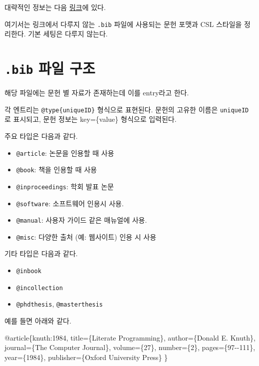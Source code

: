 \documentclass[
  letterpaper,
]{scrbook}
\newenvironment{Shaded}{\begin{snugshade}}{\end{snugshade}}
\newcommand{\DataTypeTok}[1]{\textcolor[rgb]{0.68,0.00,0.00}{#1}}
\newcommand{\NormalTok}[1]{\textcolor[rgb]{0.00,0.23,0.31}{#1}}
\newcommand{\OtherTok}[1]{\textcolor[rgb]{0.00,0.23,0.31}{#1}}
\newcommand{\VariableTok}[1]{\textcolor[rgb]{0.07,0.07,0.07}{#1}}
\providecommand{\tightlist}{%
  \setlength{\itemsep}{0pt}\setlength{\parskip}{0pt}}\usepackage{longtable,booktabs,array}
\begin{document}
대략적인 정보는 다음
\href{https://quarto.org/docs/authoring/citations.html\#sec-citations-style}{링크}에
있다.

여기서는 링크에서 다루지 않는 \texttt{.bib} 파일에 사용되는 문헌 포맷과
CSL 스타일을 정리한다. 기본 세팅은 다루지 않는다.

\section{\texorpdfstring{\texttt{.bib} 파일
구조}{.bib 파일 구조}}\label{bib-uxd30cuxc77c-uxad6cuxc870}

해당 파일에는 문헌 별 자료가 존재하는데 이를 entry라고 한다.

각 엔트리는 \texttt{@type\{uniqueID\}} 형식으로 표현된다. 문헌의 고유한
이름은 \texttt{uniqueID} 로 표시되고, 문헌 정보는 key=\{value\} 형식으로
입력된다.

주요 타입은 다음과 같다.

\begin{itemize}
\tightlist
\item
  \texttt{@article}: 논문을 인용할 때 사용
\item
  \texttt{@book}: 책을 인용할 때 사용
\item
  \texttt{@inproceedings}: 학회 발표 논문
\item
  \texttt{@software}: 소프트웨어 인용시 사용.
\item
  \texttt{@manual}: 사용자 가이드 같은 매뉴얼에 사용.
\item
  \texttt{@misc}: 다양한 출처 (예: 웹사이트) 인용 시 사용
\end{itemize}

기타 타입은 다음과 같다.

\begin{itemize}
\tightlist
\item
  \texttt{@inbook}
\item
  \texttt{@incollection}
\item
  \texttt{@phdthesis}, \texttt{@masterthesis}
\end{itemize}

예를 들면 아래와 같다.

\begin{Shaded}
\begin{Highlighting}[]
\VariableTok{@article}\NormalTok{\{}\OtherTok{knuth:1984}\NormalTok{,}
  \DataTypeTok{title}\NormalTok{=\{Literate Programming\},}
  \DataTypeTok{author}\NormalTok{=\{Donald E. Knuth\},}
  \DataTypeTok{journal}\NormalTok{=\{The Computer Journal\},}
  \DataTypeTok{volume}\NormalTok{=\{27\},}
  \DataTypeTok{number}\NormalTok{=\{2\},}
  \DataTypeTok{pages}\NormalTok{=\{97{-}{-}111\},}
  \DataTypeTok{year}\NormalTok{=\{1984\},}
  \DataTypeTok{publisher}\NormalTok{=\{Oxford University Press\}}
\NormalTok{\}}
\end{Highlighting}
\end{Shaded}
\end{document}
